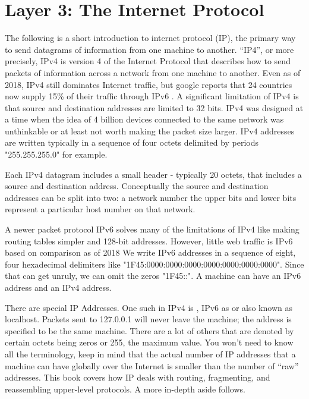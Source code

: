 \section{Layer 3: The Internet Protocol}

The following is a short introduction to internet protocol (IP), the primary way to send datagrams of information from one machine to another.
``IP4'', or more precisely, IPv4 is version 4 of the Internet Protocol that describes how to send packets of information across a network from one machine to another.
Even as of 2018, IPv4 still dominates Internet traffic, but google reports that 24 countries now supply 15\% of their traffic through IPv6 \cite{internet_society_2018}.
A significant limitation of IPv4 is that source and destination addresses are limited to 32 bits.
IPv4 was designed at a time when the idea of 4 billion devices connected to the same network was unthinkable or at least not worth making the packet size larger.
IPv4 addresses are written typically in a sequence of four octets delimited by periods "255.255.255.0" for example.

Each IPv4 datagram includes a small header - typically 20 octets, that includes a source and destination address.
Conceptually the source and destination addresses can be split into two: a network number the upper bits and lower bits represent a particular host number on that network.

A newer packet protocol IPv6 solves many of the limitations of IPv4 like making routing tables simpler and 128-bit addresses.
However, little web traffic is IPv6 based on comparison as of 2018 \cite{internet_society_2018}
We write IPv6 addresses in a sequence of eight, four hexadecimal delimiters like "1F45:0000:0000:0000:0000:0000:0000:0000".
Since that can get unruly, we can omit the zeros "1F45::". A machine can have an IPv6 address and an IPv4 address.

There are special IP Addresses.
One such in IPv4 is , IPv6 as  or  also known as localhost.
Packets sent to 127.0.0.1 will never leave the machine; the address is specified to be the same machine.
There are a lot of others that are denoted by certain octets being zeros or 255, the maximum value. You won't need to know all the terminology, keep in mind that the actual number of IP addresses that a machine can have globally over the Internet is smaller than the number of ``raw'' addresses.
This book covers how IP deals with routing, fragmenting, and reassembling upper-level protocols. A more in-depth aside follows.

